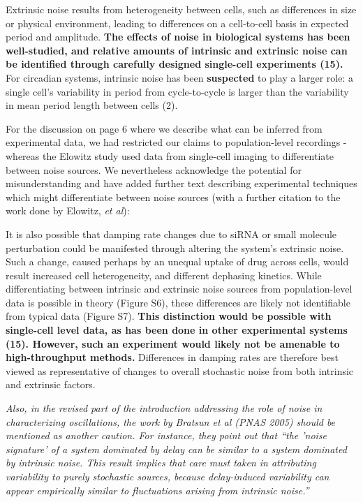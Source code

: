 \documentclass[11pt, letterpaper]{article}
\newenvironment{reviewer}{\itshape\color{gray}}{}
\newenvironment{manuscript}[1]{\begin{center}\begin{tcolorbox}[colback=green!5!white,colframe=green!75!black,width=\textwidth,title={#1},breakable,fonttitle=\bfseries]}{\end{tcolorbox}\end{center}}
\begin{document}
\begin{manuscript}{Page 3}
Extrinsic noise results from heterogeneity between cells, such as differences in size or physical environment, leading to differences on a cell-to-cell basis in expected period and amplitude. 
{\bfseries The effects of noise in biological systems has been well-studied, and relative amounts of intrinsic and extrinsic noise can be identified through carefully designed single-cell experiments (15). }
For circadian systems, intrinsic noise has been {\bfseries suspected} to play a larger role: a single cell's variability in period from cycle-to-cycle is larger than the variability in mean period length between cells (2).
\end{manuscript}

For the discussion on page 6 where we describe what can be inferred from experimental data, we had restricted our claims to population-level recordings - whereas the Elowitz study used data from single-cell imaging to differentiate between noise sources. We nevertheless acknowledge the potential for misunderstanding and have added further text describing experimental techniques which might differentiate between noise sources (with a further citation to the work done by Elowitz, {\itshape et al}):

\begin{manuscript}{Pages 6-7}
It is also possible that damping rate changes due to siRNA or small molecule perturbation could be manifested through altering the system's extrinsic noise. 
Such a change, caused perhaps by an unequal uptake of drug across cells, would result increased cell heterogeneity, and different dephasing kinetics. 
While differentiating between intrinsic and extrinsic noise sources from population-level data is possible in theory (Figure S6), these differences are likely not identifiable from typical data (Figure S7). 
{\bfseries This distinction would be possible with single-cell level data, as has been done in other experimental systems (15). 
However, such an experiment would likely not be amenable to high-throughput methods.}
Differences in damping rates are therefore best viewed as representative of changes to overall stochastic noise from both intrinsic and extrinsic factors.
\end{manuscript}

\begin{reviewer}
Also, in the revised part of the introduction addressing the role of noise in characterizing oscillations, the work by Bratsun et al (PNAS 2005) should be mentioned as another caution. For instance, they point out that ``the 'noise signature' of a system dominated by delay can be similar to a system dominated by intrinsic noise. This result implies that care must taken in attributing variability to purely stochastic sources, because delay-induced variability can appear empirically similar to fluctuations arising from intrinsic noise.''
\end{reviewer}
\end{document}
